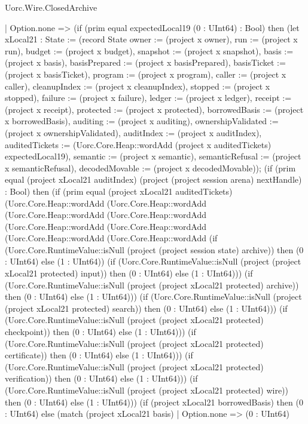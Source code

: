 \begin{lexlean}{Uorc.Wire.ClosedArchive}
\begin{semanticmodule}
{    | Option.none => (if (prim equal expectedLocal19 (0 : UInt64) : Bool) then (let xLocal21 : State := (record State {owner := (project x owner), run := (project x run), budget := (project x budget), snapshot := (project x snapshot), basis := (project x basis), basisPrepared := (project x basisPrepared), basisTicket := (project x basisTicket), program := (project x program), caller := (project x caller), cleanupIndex := (project x cleanupIndex), stopped := (project x stopped), failure := (project x failure), ledger := (project x ledger), receipt := (project x receipt), protected := (project x protected), borrowedBasis := (project x borrowedBasis), auditing := (project x auditing), ownershipValidated := (project x ownershipValidated), auditIndex := (project x auditIndex), auditedTickets := (Uorc.Core.Heap::wordAdd (project x auditedTickets) expectedLocal19), semantic := (project x semantic), semanticRefusal := (project x semanticRefusal), decodedMovable := (project x decodedMovable)}); (if (prim equal (project xLocal21 auditIndex) (project (project session arena) nextHandle) : Bool) then (if (prim equal (project xLocal21 auditedTickets) (Uorc.Core.Heap::wordAdd (Uorc.Core.Heap::wordAdd (Uorc.Core.Heap::wordAdd (Uorc.Core.Heap::wordAdd (Uorc.Core.Heap::wordAdd (Uorc.Core.Heap::wordAdd (Uorc.Core.Heap::wordAdd (Uorc.Core.Heap::wordAdd (if (Uorc.Core.RuntimeValue::isNull (project (project session state) archive)) then (0 : UInt64) else (1 : UInt64)) (if (Uorc.Core.RuntimeValue::isNull (project (project xLocal21 protected) input)) then (0 : UInt64) else (1 : UInt64))) (if (Uorc.Core.RuntimeValue::isNull (project (project xLocal21 protected) archive)) then (0 : UInt64) else (1 : UInt64))) (if (Uorc.Core.RuntimeValue::isNull (project (project xLocal21 protected) search)) then (0 : UInt64) else (1 : UInt64))) (if (Uorc.Core.RuntimeValue::isNull (project (project xLocal21 protected) checkpoint)) then (0 : UInt64) else (1 : UInt64))) (if (Uorc.Core.RuntimeValue::isNull (project (project xLocal21 protected) certificate)) then (0 : UInt64) else (1 : UInt64))) (if (Uorc.Core.RuntimeValue::isNull (project (project xLocal21 protected) verification)) then (0 : UInt64) else (1 : UInt64))) (if (Uorc.Core.RuntimeValue::isNull (project (project xLocal21 protected) wire)) then (0 : UInt64) else (1 : UInt64))) (if (project xLocal21 borrowedBasis) then (0 : UInt64) else (match (project xLocal21 basis)
      | Option.none => (0 : UInt64)
}
\end{semanticmodule}
\end{lexlean}
